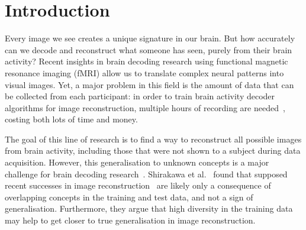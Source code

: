 \chapter{Introduction}


Every image we see creates a unique signature in our brain. But how accurately can we decode and reconstruct what someone has seen, purely from their brain activity? Recent insights in brain decoding research using functional magnetic resonance imaging (fMRI) allow us to translate complex neural patterns into visual images\cite{shenDeepImageReconstruction2019,scottiMindEye2SharedSubjectModels2024,ozcelikNaturalSceneReconstruction2023}. Yet, a major problem in this field is the amount of data that can be collected from each participant: in order to train brain activity decoder algorithms for image reconstruction, multiple hours of recording are needed~\cite{horikawaGenericDecodingSeen2017,gifford7TFMRIDataset2025,hebartTHINGSdataMultimodalCollection2023}, costing both lots of time and money. 

The goal of this line of research is to find a way to reconstruct all possible images from brain activity, including those that were not shown to a subject during data acquisition. However, this generalisation to unknown concepts is a major challenge for brain decoding research~\cite{kamitaniDecodingVisualSubjective2005}. Shirakawa et al.~\cite{shirakawaSpuriousReconstructionBrain2024} found that supposed recent successes in image reconstruction~\cite{ozcelikNaturalSceneReconstruction2023,scottiMindEye2SharedSubjectModels2024} are likely only a consequence of overlapping concepts in the training and test data, and not a sign of generalisation. Furthermore, they argue that high diversity in the training data may help to get closer to true generalisation in image reconstruction. 

